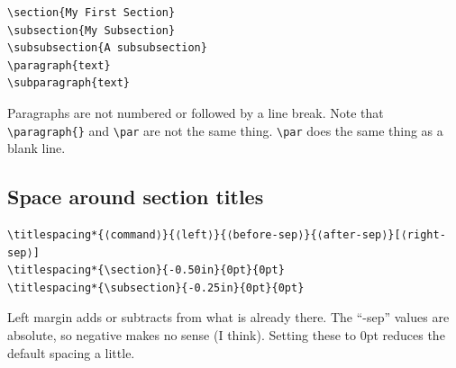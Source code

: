\documentclass{article}
\begin{document}
\begin{minipage}[t]{0.5\textwidth}
\begin{verbatim}
\section{My First Section}
\subsection{My Subsection}
\subsubsection{A subsubsection}
\paragraph{text}
\subparagraph{text}
\end{verbatim}
\end{minipage}
\begin{minipage}[t]{0.5\textwidth}
Paragraphs are not numbered or followed by a line break.
Note that \verb|\paragraph{}| and \verb|\par| are not the same thing.
\verb|\par| does the same thing as a blank line.
\end{minipage}

\subsection{Space around section titles}
\begin{minipage}[t]{\textwidth}
\begin{verbatim}
\titlespacing*{⟨command⟩}{⟨left⟩}{⟨before-sep⟩}{⟨after-sep⟩}[⟨right-sep⟩]
\titlespacing*{\section}{-0.50in}{0pt}{0pt}
\titlespacing*{\subsection}{-0.25in}{0pt}{0pt}
\end{verbatim}
\end{minipage}
\begin{minipage}[t]{\textwidth}
    Left margin adds or subtracts from what is already there. The ``-sep'' values
    are absolute, so negative makes no sense (I think). Setting these to 0pt
    reduces the default spacing a little.
\end{minipage}
\end{document}
